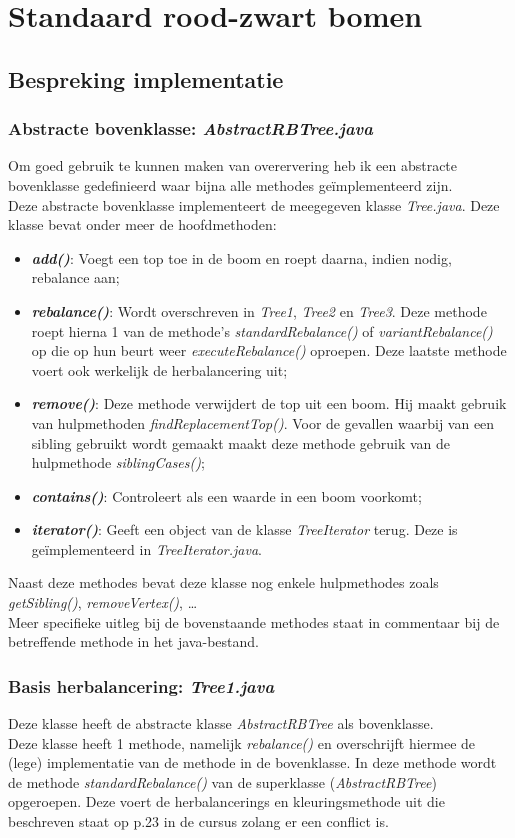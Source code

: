 \documentclass[11pt,a4paper]{report}
\begin{document}
\section{Standaard rood-zwart bomen}
\subsection{Bespreking implementatie}
\subsubsection*{Abstracte bovenklasse: \textsl{AbstractRBTree.java}}
Om goed gebruik te kunnen maken van overervering heb ik een abstracte bovenklasse gedefinieerd waar bijna alle methodes ge\"implementeerd zijn.\\
Deze abstracte bovenklasse implementeert de meegegeven klasse \textsl{Tree.java}. Deze klasse bevat onder meer de hoofdmethoden:
\begin{itemize}
\item \textsl{\textbf{add()}}: Voegt een top toe in de boom en roept daarna, indien nodig, rebalance aan;
\item \textsl{\textbf{rebalance()}}: Wordt overschreven in \textsl{Tree1}, \textsl{Tree2} en \textsl{Tree3}. Deze methode roept hierna 1 van de methode's \textsl{standardRebalance()} of \textsl{variantRebalance()} op die op hun beurt weer \textsl{executeRebalance()} oproepen. Deze laatste methode voert ook werkelijk de herbalancering uit;
\item \textsl{\textbf{remove()}}: Deze methode verwijdert de top uit een boom. Hij maakt gebruik van hulpmethoden \textsl{findReplacementTop()}. Voor de gevallen waarbij van een sibling gebruikt wordt gemaakt maakt deze methode gebruik van de hulpmethode \textsl{siblingCases()};
\item \textsl{\textbf{contains()}}: Controleert als een waarde in een boom voorkomt;
\item \textsl{\textbf{iterator()}}: Geeft een object van de klasse \textsl{TreeIterator} terug. Deze is ge\"implementeerd in \textsl{TreeIterator.java}.
\end{itemize}
Naast deze methodes bevat deze klasse nog enkele hulpmethodes zoals \textsl{getSibling()}, \textsl{removeVertex()}, \dots \\
Meer specifieke uitleg bij de bovenstaande methodes staat in commentaar bij de betreffende methode in het java-bestand.
\subsubsection*{Basis herbalancering: \textsl{Tree1.java}}
Deze klasse heeft de abstracte klasse \textsl{AbstractRBTree} als bovenklasse.\\
Deze klasse heeft 1 methode, namelijk \textsl{rebalance()} en overschrijft hiermee de (lege) implementatie van de methode in de bovenklasse. In deze methode wordt de methode \textsl{standardRebalance()} van de superklasse (\textsl{AbstractRBTree}) opgeroepen. Deze voert de herbalancerings en kleuringsmethode uit die beschreven staat op p.23 in de cursus zolang er een conflict is.
\end{document}
